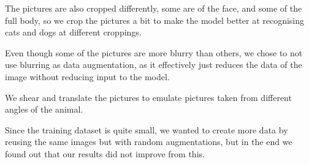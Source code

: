 The pictures are also cropped differently, some are of the face, and some of the full body, so we crop the pictures a bit to make the model better at recognising cats and dogs at different croppings.

Even though some of the pictures are more blurry than others, we chose to not use blurring as data augmentation, as it effectively just reduces the data of the image without reducing input to the model.

We shear and translate the pictures to emulate pictures taken from different angles of the animal.

Since the training dataset is quite small, we wanted to create more data by reusing the same images but with random augmentations, but in the end we found out that our results did not improve from this.